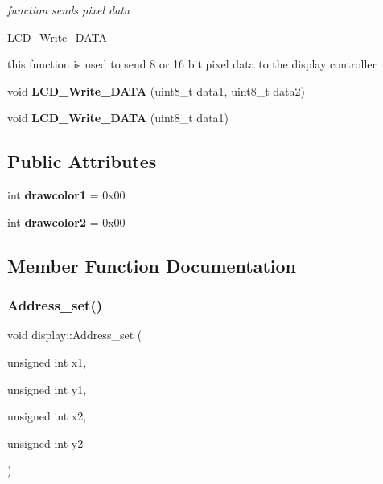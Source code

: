 \textbf{ }\par
{\em function sends pixel data

L\+C\+D\+\_\+\+Write\+\_\+\+D\+A\+TA

this function is used to send 8 or 16 bit pixel data to the display controller }\begin{DoxyCompactItemize}
\item 
\mbox{\label{classdisplay_a459e32125fb569af6a22305413ea899a}} 
void {\bfseries L\+C\+D\+\_\+\+Write\+\_\+\+D\+A\+TA} (uint8\+\_\+t data1, uint8\+\_\+t data2)
\item 
\mbox{\label{classdisplay_a03a6769063c17f2f22bd1b75bf1d5935}} 
void {\bfseries L\+C\+D\+\_\+\+Write\+\_\+\+D\+A\+TA} (uint8\+\_\+t data1)
\end{DoxyCompactItemize}

\subsection*{Public Attributes}
\begin{DoxyCompactItemize}
\item 
\mbox{\label{classdisplay_ab6b90d0b3f74bc8ccb379bba67457004}} 
int {\bfseries drawcolor1} = 0x00
\item 
\mbox{\label{classdisplay_a8f805030a8fb7876eda55bd1897db703}} 
int {\bfseries drawcolor2} = 0x00
\end{DoxyCompactItemize}


\subsection{Member Function Documentation}
\mbox{\label{classdisplay_ade81aa04a5c49aaf7a663b7e03ca5a36}} 
\subsubsection{\texorpdfstring{Address\+\_\+set()}{Address\_set()}}
{\footnotesize\ttfamily void display\+::\+Address\+\_\+set (\begin{DoxyParamCaption}\item[{unsigned int}]{x1,  }\item[{unsigned int}]{y1,  }\item[{unsigned int}]{x2,  }\item[{unsigned int}]{y2 }\end{DoxyParamCaption})}



